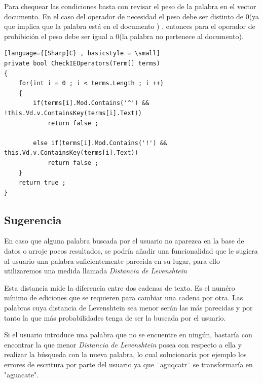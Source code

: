 \documentclass{article}
\begin{document}
Para chequear las condiciones basta con revisar el peso de la palabra en el vector documento. En el caso del operador de
necesidad el peso debe ser distinto de 0(ya que implica que la palabra está en el documento ) , entonces para el operador de prohibición
el peso debe ser igual a 0(la palabra no pertenece al documento). \\[5pt]

\newpage

\begin{lstlisting}[language={[Sharp]C} , basicstyle = \small]
private bool CheckIEOperators(Term[] terms)
{
    for(int i = 0 ; i < terms.Length ; i ++)
    {
        if(terms[i].Mod.Contains('^') && !this.Vd.v.ContainsKey(terms[i].Text))
            return false ;
            
        else if(terms[i].Mod.Contains('!') && this.Vd.v.ContainsKey(terms[i].Text))
            return false ;
    }
    return true ;
}    
\end{lstlisting}

\subsection{Sugerencia}
En caso que alguna palabra buscada por el usuario no aparezca en la base de datos o arroje pocos resultados, se podría añadir una funcionalidad que
le sugiera al usuario una palabra suficientemente parecida en su lugar, para ello utilizaremos una medida llamada \textit{Distancia de Levenshtein}

Esta distancia mide la diferencia entre dos cadenas de texto. Es el numéro mínimo de ediciones que se requieren para cambiar una cadena por otra. Las palabras
cuya distancia de Levenshtein sea menor serán las más parecidas y por tanto la que más probabilidades tenga de ser la buscada por el usuario.

Si el usuario introduce una palabra que no se encuentre en ningún, bastaría con encontrar la que menor \textit{Distancia de Levenshtein} posea con respecto
a ella y realizar la búsqueda con la nueva palabra, lo cual solucionaría por ejemplo los errores de escritura por parte del usuario ya que ¨aguqcatr¨ se transformaría
en "aguacate".
\end{document}
